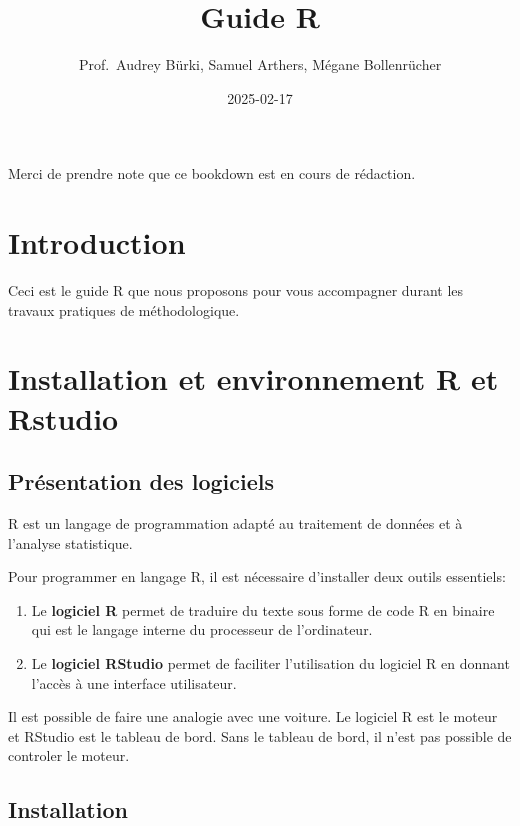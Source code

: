 \documentclass[
]{book}
\title{Guide R}
\author{Prof.~Audrey Bürki, Samuel Arthers, Mégane Bollenrücher}
\date{2025-02-17}
\providecommand{\tightlist}{%
  \setlength{\itemsep}{0pt}\setlength{\parskip}{0pt}}
\begin{document}
\maketitle

{
\setcounter{tocdepth}{1}
\tableofcontents
}
Merci de prendre note que ce bookdown est en cours de rédaction.

\chapter{Introduction}\label{introduction}

Ceci est le guide R que nous proposons pour vous accompagner durant les travaux pratiques de méthodologique.

\chapter{Installation et environnement R et Rstudio}\label{installation-et-environnement-r-et-rstudio}

\section{Présentation des logiciels}\label{pruxe9sentation-des-logiciels}

R est un langage de programmation adapté au traitement de données et à l'analyse statistique.

Pour programmer en langage R, il est nécessaire d'installer deux outils essentiels:

\begin{enumerate}
\def\labelenumi{\arabic{enumi}.}
\tightlist
\item
  Le \textbf{logiciel R} permet de traduire du texte sous forme de code R en binaire qui est le langage interne du processeur de l'ordinateur.
\item
  Le \textbf{logiciel RStudio} permet de faciliter l'utilisation du logiciel R en donnant l'accès à une interface utilisateur.
\end{enumerate}

Il est possible de faire une analogie avec une voiture. Le logiciel R est le moteur et RStudio est le tableau de bord. Sans le tableau de bord, il n'est pas possible de controler le moteur.

\section{Installation}\label{installation}
\end{document}
